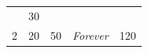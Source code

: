 \begin{table}[H]
\begin{tabular}{ccccc}
                                                                 & 30                                                                            &                                                                                &                                    &                                                                                \\
\multirow{-3}{*}{2}                                              & 20                                                                            & \multirow{-3}{*}{50}                                                           & \multirow{-3}{*}{\textit{Forever}} & \multirow{-3}{*}{120}                                                          \\ \hline
\end{tabular}
\end{table}



